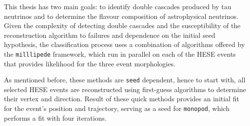 This thesis has two main goals: to identify double cascades produced by tau neutrinos and to determine the flavour composition of astrophysical neutrinos. Given the complexity of detecting double cascades and the susceptibility of the reconstruction algorithm to failures and dependence on the initial seed hypothesis, the classification process uses a combination of algorithms offered by the \texttt{milllipede} framework, which run in parallel on each of the HESE events that provides likelihood for the three event morphologies. 

As mentioned before, these methods are \texttt{seed} dependent, hence to start with, all selected HESE events are reconstructed using first-guess algorithms to determine their vertex and direction. Result of these quick methods provides an initial fit for the event's position and trajectory, serving as a seed for \texttt{monopod}, which performs a fit with four iterations. \newpage

